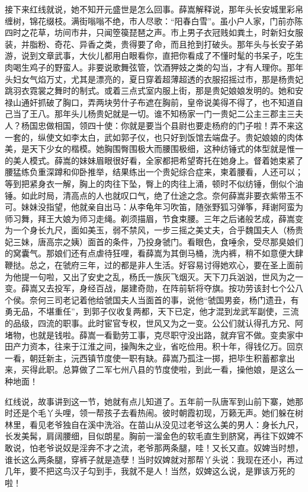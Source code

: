 接下来红线就说，她不知开元盛世是怎么回事。薛嵩解释说，那年头长安城里彩帛缠树，锦花缀枝。满街嗡嗡不绝，市人尽歌：“阳春白雪”。虽小户人家，门前亦陈四时之花草，坊间市井，只闻箜篌琵琶之声。市上男子衣冠贱如粪土，时新妇女服装，并脂粉、奇花、异香之类，贵得要了命，而且抢到打破头。那年头与长安子弟游，说到文章武事，大伙儿都用白眼看你，直把你看成了不懂时髦的书呆子，吃生肉喝生鸡子的野蛮人。非要说歌舞弦管，饮酒狎妓之类的勾当，才有人理你。那年头妇女气焰万丈，尤其是漂亮的，夏日穿着超薄超透的衣服招摇过市，那是杨贵妃跳羽衣霓裳之舞时的制式。或着三点式室内服上街，那是贵妃娘娘发明的。她和安禄山通奸抓破了胸口，弄两块劳什子布遮在胸前，皇帝说美得不得了，也不知道自己当了王八。那年头儿杨贵妃就是一切。谁不知杨家一门一贵妃二公主三郡主三夫人？杨国忠做相国，领四十使：你就是要当个县尉也要走杨府的门子啦！弄不来这一套的，纵使文如李太白，武如郭子仪，也只好到饭馆去端盘子。贵妃娘娘的肉体美，是天下少女的楷模。她胸围臀围极大而腰围极细，这种纺锤式的体型就是惟一的美人模式。薛嵩的妹妹眉眼很好看，全家都把希望寄托在她身上。督着她束紧了腰猛练负重深蹲和仰卧推举，结果练出一个贵妃综合症来，柬着腰看，人还可以；等到把紧身衣一解，胸上的肉往下坠，臀上的肉往上涌，顿时不似纺锤，倒似个油锤。如此时局，清高点的人也就叹口气，绝了仕途之念。奈何薛嵩非要衣紫带玉不可。妹妹没指望，他就亲自出马：从李龟年习吹笛，随张野狐习弹筝，拜谢阿蛮为师习舞，拜王大娘为师习走绳。剃须描眉，节食束腰。三年之后诸般艺成，薛嵩变为一个身长九尺，面如美玉，弱不禁风，一步三摇之美丈夫，合乎魏国夫人（杨贵妃三妹，唐高宗之姨）面首的条件，乃投身虢门。看眼色，食唾余，受尽那臭娘们的窝囊气。那娘们还有点虐待狂哩，看薛嵩为其倒马桶，洗内裤，稍不如意便大肆鞭挞。总之，在虢府三年，过的都是非人生活。好容易讨得她欢心，要在圣上面前为他提一句啦，又出了安史之乱，杨氏一族灰飞烟灭。天下刀兵汹汹，世风为之一变。薛嵩又去投军，身经百战，屡建奇勋，在阵前斩将夺旗。按功劳该封七个公八个侯。奈何三司老记着他给虢国夫人当面首的事，说他“虢国男妾，杨门遗丑，有勇无品，不堪重任”，到郭子仪收复两都，天下已定，他才混到龙武军副使，三流的品级，四流的职事。此时宦官专权，世风又为之一变。公公们就认得孔方兄、阿堵物，也就是钱啦。薛嵩一看勤劳工事，克尽职守没出路，就弃官不做。变卖家中田产力资本，往来于江淮之间，操陶朱之业，省吃俭用。积十年，得钱亿万。回京一看，朝廷新主，沅西镇节度使一职有缺。薛嵩乃孤注一掷，把毕生积蓄都拿出来，买得此职。总算做了二军七州八县的节度使啦，到此一看，操他娘，是这么一种地面！ 

红线说，故事讲到这一节，她就有点儿知道了。五年前一队唐军到山前下寨，她那时还是个毛丫头哩，领一帮孩子去看热闹。彼时朝霞初现，万籁无声。她们躲在树林里，看见老爷独自在溪中洗浴。在苗山从没见过老爷这么美的男人：身长九尺，长发美髯，肩阔腰细，目似朗星。胸前一溜金色的软毛直生到脐窝，再往下奴婢不敢说，怕老爷说奴是淫奔不才之流，老爷那两条腿，哇！又长又直。奴婢当时想，谁长这么两条腿，穿裤子就是造孽！当时奴婢就对那帮丫头说：我现在还小，再过几年，要不把这鸟汉子勾到手，我就不是人！当然，奴婢这么说，是罪该万死的啦！ 

